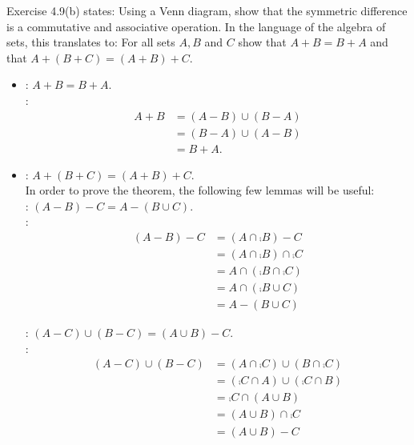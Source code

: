 \documentclass[12pt]{book}
\begin{document}
\begin{enumerate}
{Exercise 4.9(b) states: Using a Venn diagram, show that the symmetric difference is a commutative and associative operation. In the language of the algebra of sets, this translates to: For all sets $A,B$ and $C$ show that $A + B = B + A$ and that $A + (B + C) = (A + B) + C$.
\begin{itemize}
\item {}: $A + B = B + A$.\\
: \begin{align*}A + B &= (A - B) \cup (B - A)\tag{Definition of symmetric difference}\\&=
(B - A) \cup (A - B)\tag{5.1.2}\\&= 
B + A.\tag{Definition of symmetric difference}\end{align*}
\item {}: $A + (B + C) = (A + B) + C$.\\
In order to prove the theorem, the following few lemmas will be useful:\\
: $(A - B) - C = A - (B \cup C)$.\\
: \begin{align*}(A - B) - C &= (A \cap \comp{B}) - C \tag{Definition of relative complement}\\&= (A \cap \comp{B}) \cap \comp{C}\tag{Definition of relative complement}\\&= A \cap (\comp{B} \cap \comp{C}) \tag{5.1.1'}\\&= A \cap (\comp{B \cup C})\tag{5.1.13}\\&= A - (B \cup C)\tag{Definition of relative complement}\end{align*} 

: $(A - C) \cup (B - C) = (A \cup B) - C$.\\
: \begin{align*}(A - C) \cup (B - C) &= (A \cap \comp{C}) \cup (B \cap \comp{C})\tag{Definition of relative complement}\\&= (\comp{C} \cap A) \cup (\comp{C} \cap B)\tag{5.1.2'}\\&= \comp{C} \cap (A \cup B)\tag{5.1.3'}\\&= (A \cup B) \cap \comp{C}\tag{5.1.2'}\\&= (A \cup B) - C \tag{Definition of relative complement}\end{align*}


\end{itemize}}
\end{enumerate}
\end{document}
